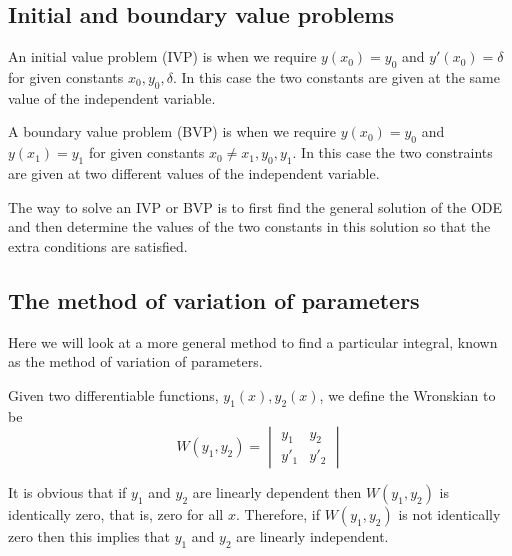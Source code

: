 \documentclass[10pt, a4paper]{article}
\begin{document}
\subsection{Initial and boundary value problems}
An initial value problem (IVP) is when we require $y(x_0) = y_0$ and $y'(x_0) = \delta$ for given constants $x_0, y_0, \delta$.
In this case the two constants are given at the same value of the independent variable.

A boundary value problem (BVP) is when we require $y(x_0) = y_0$ and $y(x_1) = y_1$ for given constants $x_0 \neq x_1, y_0, y_1$.
In this case the two constraints are given at two different values of the independent variable.

The way to solve an IVP or BVP is to first find the general solution of the ODE and then determine the values of the two constants in this solution so that the extra conditions are satisfied.

\subsection{The method of variation of parameters}
Here we will look at a more general method to find a particular integral,
known as the method of variation of parameters.

\begin{definition}[Wronskian]
    Given two differentiable functions, $y_1(x), y_2(x)$,
    we define the Wronskian to be
    \[
    W(y_1, y_2) = \begin{vmatrix}
        y_1 & y_2 \\ y'_1 & y'_2
    \end{vmatrix}
    \]
\end{definition}

It is obvious that if $y_1$ and $y_2$ are linearly dependent then $W(y_1, y_2)$ is identically zero,
that is,
zero for all $x$.
Therefore,
if $W(y_1, y_2)$ is not identically zero then this implies that $y_1$ and $y_2$ are linearly independent.
\end{document}
